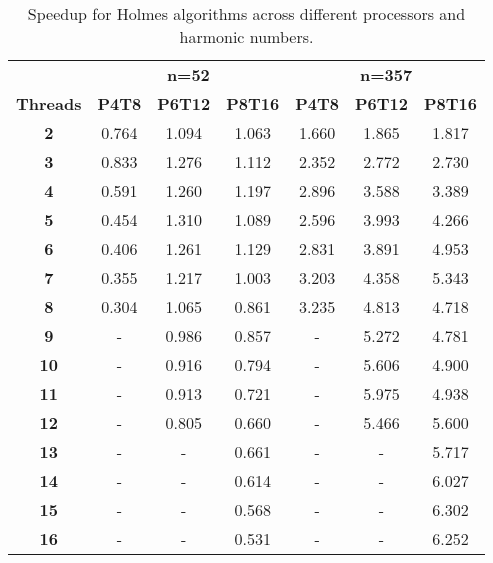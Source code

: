 
\begin{table*}[ht]
\centering
\caption{Speedup for Holmes algorithms across different processors and harmonic numbers.}
\label{tab:speedup_metrics}
\begin{tabular}{c|ccc|ccc}
\hline
 & \multicolumn{3}{c}{\textbf{n=52}}  & \multicolumn{3}{c}{\textbf{n=357}}  \\
\cline{2-7}
{\textbf{Threads}}
& \textbf{P4T8} & \textbf{P6T12} & \textbf{P8T16} & \textbf{P4T8} & \textbf{P6T12} & \textbf{P8T16} \\
\hline
\textbf{2} & 0.764 & 1.094 & 1.063 & 1.660 & 1.865 & 1.817 \\ \hline
\textbf{3} & 0.833 & 1.276 & 1.112 & 2.352 & 2.772 & 2.730 \\ \hline
\textbf{4} & 0.591 & 1.260 & 1.197 & 2.896 & 3.588 & 3.389 \\ \hline
\textbf{5} & 0.454 & 1.310 & 1.089 & 2.596 & 3.993 & 4.266 \\ \hline
\textbf{6} & 0.406 & 1.261 & 1.129 & 2.831 & 3.891 & 4.953 \\ \hline
\textbf{7} & 0.355 & 1.217 & 1.003 & 3.203 & 4.358 & 5.343 \\ \hline
\textbf{8} & 0.304 & 1.065 & 0.861 & 3.235 & 4.813 & 4.718 \\ \hline
\textbf{9} & - & 0.986 & 0.857 & - & 5.272 & 4.781 \\ \hline
\textbf{10} & - & 0.916 & 0.794 & - & 5.606 & 4.900 \\ \hline
\textbf{11} & - & 0.913 & 0.721 & - & 5.975 & 4.938 \\ \hline
\textbf{12} & - & 0.805 & 0.660 & - & 5.466 & 5.600 \\ \hline
\textbf{13} & - & - & 0.661 & - & - & 5.717 \\ \hline
\textbf{14} & - & - & 0.614 & - & - & 6.027 \\ \hline
\textbf{15} & - & - & 0.568 & - & - & 6.302 \\ \hline
\textbf{16} & - & - & 0.531 & - & - & 6.252 \\ \hline

\end{tabular}
\end{table*}
